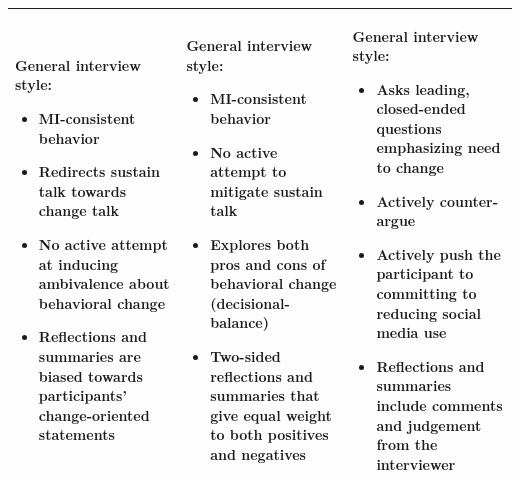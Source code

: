 \begin{tabularx}{\textwidth}{
  >{\raggedright\arraybackslash}X
  >{\raggedright\arraybackslash}X
  >{\raggedright\arraybackslash}X}
\begin{minipage}[t]{\linewidth}
\textbf{General interview style:}
\begin{itemize}[leftmargin=*,nosep]
\item MI-consistent behavior 
\item Redirects sustain talk towards change talk
\item No active attempt at inducing ambivalence about behavioral change
\item Reflections and summaries are biased towards participants’ change-oriented statements
\end{itemize}
\end{minipage}
&
\vspace{-0.5em}
\begin{minipage}[t]{\linewidth}\vspace{0pt}
\textbf{General interview style:}
\begin{itemize}[leftmargin=*,nosep]
\item MI-consistent behavior
\item No active attempt to mitigate sustain talk
\item Explores both pros and cons of behavioral change (decisional-balance)
\item Two-sided reflections and summaries that give equal weight to both positives and negatives
\end{itemize}
\end{minipage}
&
\vspace{-0.5em}
\begin{minipage}[t]{\linewidth}\vspace{0pt}\raggedright
\textbf{General interview style:}
\begin{itemize}[leftmargin=*,nosep]
\item Asks leading, closed-ended questions emphasizing need to change
\item Actively counter-argue
\item Actively push the participant to committing to reducing social media use
\item Reflections and summaries include comments and judgement from the interviewer
\end{itemize}
\end{minipage}
\\
\bottomrule
\end{tabularx}
